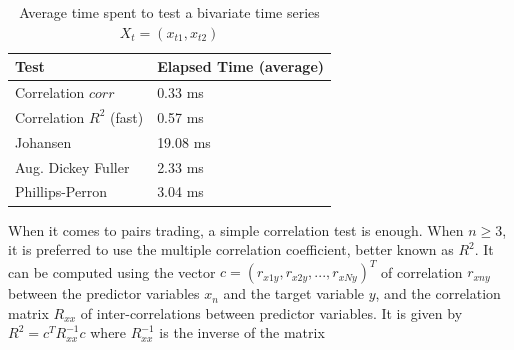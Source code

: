 \documentclass[11pt,a4,twosided,singlespacing,titlepagenumber=on]{scrreprt}
\numberwithin{equation}{chapter} %
\theoremstyle{remark}
\begin{document}
\begin{table}[H]
\centering
\begin{tabular}{ll}
\hline
\multicolumn{1}{|l|}{Test}     & \multicolumn{1}{l|}{Elapsed Time (average)} \\ \hline
Correlation $corr$						 &  0.33 ms \\
Correlation $R^2$ (fast)       &  0.57 ms \\
Johansen                       &  19.08 ms\\
Aug. Dickey Fuller             &  2.33 ms\\
Phillips-Perron                &  3.04 ms\\
\hline
\end{tabular}
\caption{Average time spent to test a bivariate time series $X_t = (x_{t1}, x_{t2})$}
\label{time_spent_test_bivariate}
\end{table}

When it comes to pairs trading, a simple correlation test is enough. When $n \geq 3$, it is preferred to use the multiple correlation coefficient, better known as $R^2$. It can be computed using the vector $c = (r_{x1y}, r_{x2y},...,r_{xNy})^T$ of correlation $r_{xny}$ between the predictor variables $x_n$ and the target variable $y$, and the correlation matrix $R_{xx}$ of inter-correlations between predictor variables. It is given by $R^2 = c^T R_{xx}^{-1}c$ where $R_{xx}^{-1}$ is the inverse of the matrix
\end{document}
